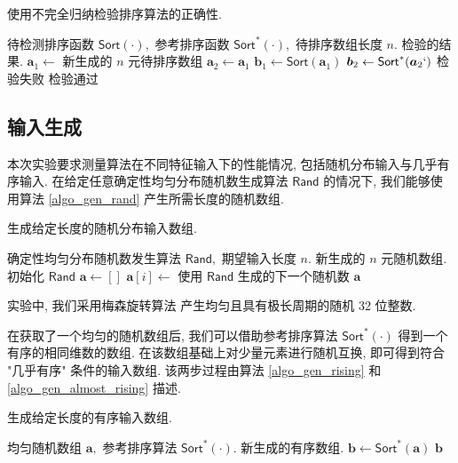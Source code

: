 \documentclass[12pt]{article}
\begin{document}
\begin{algorithm}
\caption{使用不完全归纳检验排序算法的正确性.}
\label{algo_correctness}
\begin{algorithmic}[1]
\Require 待检测排序函数 $\mathsf{Sort}(\cdot),$ 参考排序函数 $\mathsf{Sort}^*(\cdot),$ 待排序数组长度 $n.$
\Ensure 检验的结果.
\State $\bm{a}_1 \gets$ 新生成的 $n$ 元待排序数组
\State $\bm{a}_2 \gets \bm{a}_1$
\State $\bm{b}_1 \gets \mathsf{Sort}(\bm{a}_1)$
\State $\bm{b}_2 \gets \mathsf{Sort}^*(\bm{a}_2`)$
       \State \Return 检验失败
    \EndIf
\EndFor
\State \Return 检验通过
\end{algorithmic}
\end{algorithm}

\subsection{输入生成}

本次实验要求测量算法在不同特征输入下的性能情况, 包括随机分布输入与几乎有序输入. 在给定任意确定性均匀分布随机数生成算法 $\mathsf{Rand}$ 的情况下, 我们能够使用算法 \ref{algo_gen_rand} 产生所需长度的随机数组.

\begin{algorithm}
\caption{生成给定长度的随机分布输入数组.}
\label{algo_gen_rand}
\begin{algorithmic}[1]
\Require 确定性均匀分布随机数发生算法 $\mathsf{Rand},$ 期望输入长度 $n.$
\Ensure 新生成的 $n$ 元随机数组.
\State 初始化 $\mathsf{Rand}$
\State $\bm{a} \gets []$
    \State $\bm{a}[i] \gets$ 使用 $\mathsf{Rand}$ 生成的下一个随机数
\EndFor
\State \Return $\bm{a}$
\end{algorithmic}
\end{algorithm}

实验中, 我们采用梅森旋转算法 \cite{bib_mersenne_randgen} 产生均匀且具有极长周期的随机 32 位整数.

在获取了一个均匀的随机数组后, 我们可以借助参考排序算法 $\mathsf{Sort}^*(\cdot)$ 得到一个有序的相同维数的数组. 在该数组基础上对少量元素进行随机互换, 即可得到符合 "几乎有序" 条件的输入数组. 该两步过程由算法 \ref{algo_gen_rising} 和 \ref{algo_gen_almost_rising} 描述.

\begin{algorithm}
\caption{生成给定长度的有序输入数组.}
\label{algo_gen_rising}
\begin{algorithmic}[1]
\Require 均匀随机数组 $\bm{a},$ 参考排序算法 $\mathsf{Sort}^*(\cdot).$
\Ensure 新生成的有序数组.
\State $\bm{b} \gets \mathsf{Sort}^*(\bm{a})$
\State \Return $\bm{b}$
\end{algorithmic}
\end{algorithm}
\end{document}
